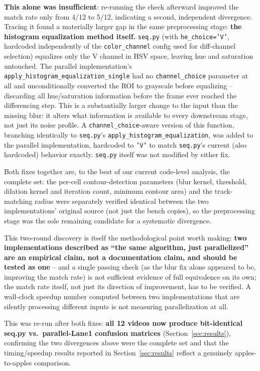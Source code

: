 \documentclass[conference]{IEEEtran}
\newcommand{\code}[1]{\texttt{#1}}
\begin{document}
\textbf{This alone was insufficient}: re-running the check afterward
improved the match rate only from 4/12 to 5/12, indicating a second,
independent divergence. Tracing it found a materially larger gap in the
same preprocessing stage: \textbf{the histogram equalization method
itself.} \code{seq.py} (with \code{he\_choice='V'}, hardcoded
independently of the \code{color\_channel} config used for diff-channel
selection) equalizes only the V channel in HSV space, leaving hue and
saturation untouched. The parallel implementation's
\code{apply\_histogram\_equalization\_single} had no
\code{channel\_choice} parameter at all and unconditionally converted
the ROI to grayscale before equalizing -- discarding all hue/saturation
information before the frame ever reached the differencing step. This
is a substantially larger change to the input than the missing blur:
it alters what information is available to every downstream stage, not
just its noise profile. A \code{channel\_choice}-aware version of this
function, branching identically to \code{seq.py}'s
\code{apply\_histogram\_equalization}, was added to the parallel
implementation, hardcoded to \code{'V'} to match \code{seq.py}'s current
(also hardcoded) behavior exactly. \code{seq.py} itself was not modified
by either fix.

Both fixes together are, to the best of our current code-level analysis,
the complete set: the per-cell contour-detection parameters (blur
kernel, threshold, dilation kernel and iteration count, minimum contour
area) and the track-matching radius were separately verified identical
between the two implementations' original source (not just the bench
copies), so the preprocessing stage was the sole remaining candidate for
a systematic divergence.

This two-round discovery is itself the methodological point worth
making: \textbf{two implementations described as ``the same algorithm,
just parallelized'' are an empirical claim, not a documentation claim,
and should be tested as one} -- and a single passing check (as the blur
fix alone appeared to be, improving the match rate) is not sufficient
evidence of full equivalence on its own; the match rate itself, not just
its direction of improvement, has to be verified. A wall-clock speedup
number computed between two implementations that are silently
processing different inputs is not measuring parallelization at all.

This was re-run after both fixes: \textbf{all 12 videos now produce
bit-identical seq.py vs.\ parallel-Lane1 confusion matrices}
(Section~\ref{sec:results}), confirming the two divergences above were
the complete set and that the timing/speedup results reported in
Section~\ref{sec:results} reflect a genuinely apples-to-apples
comparison.
\end{document}
